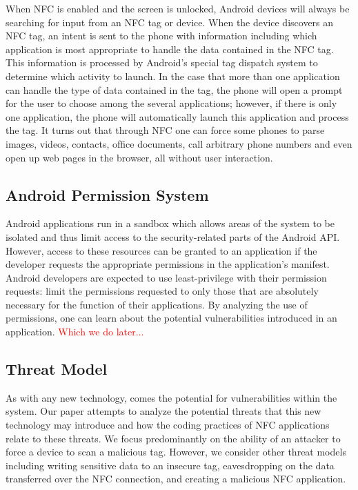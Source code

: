 \documentclass[12pt]{article}
\newcommand\TODO[1]{\textcolor{red}{#1}}
\begin{document}
When NFC is enabled and the screen is unlocked, Android devices will always be searching for input from an NFC tag or device. When the device discovers an NFC tag, an intent is sent to the phone with information including which application is most appropriate to handle the data contained in the NFC tag. This information is processed by Android's special tag dispatch system to determine which activity to launch. In the case that more than one application can handle the type of data contained in the tag, the phone will open a prompt for the user to choose among the several applications; however, if there is only one application, the phone will automatically launch this application and process the tag. It turns out that through NFC one can force some phones to parse images, videos, contacts, ofﬁce documents, call arbitrary phone numbers and even open up web pages in the browser, all without user interaction.  

\subsection{Android Permission System}
Android applications run in a sandbox which allows areas of the system to be isolated and thus limit access to the security-related parts of the Android API. However, access to these resources can be granted to an application if the developer requests the appropriate permissions in the application's manifest. Android developers are expected to use least-privilege with their permission requests: limit the permissions requested to only those that are absolutely necessary for the function of their applications. By analyzing the use of permissions, one can learn about the potential vulnerabilities introduced in an application. \TODO{Which we do later...}

\subsection{Threat Model}
As with any new technology, comes the potential for vulnerabilities within the system. Our paper attempts to analyze the potential threats that this new technology may introduce and how the coding practices of NFC applications relate to these threats. We focus predominantly on the ability of an attacker to force a device to scan a malicious tag. However, we consider other threat models including writing sensitive data to an insecure tag, eavesdropping on the data transferred over the NFC connection, and creating a malicious NFC application. 
\end{document}
